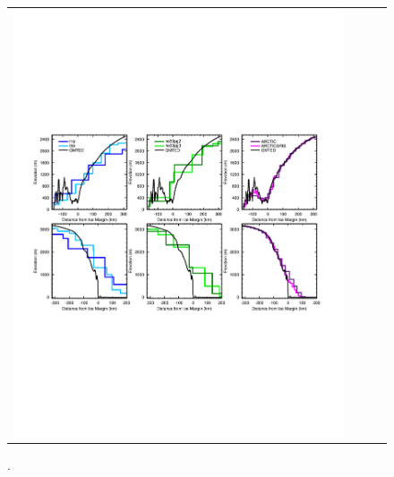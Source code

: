 \documentclass[draft]{agujournal2019}
\begin{document}
\begin{figure}[t]
\begin{center}
\begin{tabular}{cccc}
         \includegraphics[width=130mm]{figs/temp_zsects.pdf}
\end{tabular}
\end{center}
\caption{.}
\label{fig:ztrans}
\end{figure}
\end{document}
